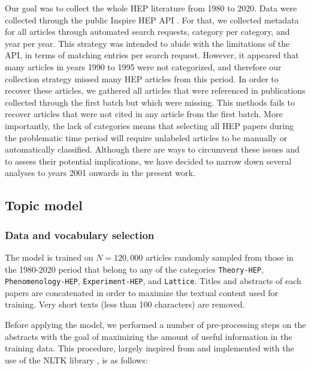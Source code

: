 \documentclass[smallextended]{svjour3}
\begin{document}
Our goal was to collect the whole HEP literature from 1980 to 2020. Data were collected through the public Inspire HEP API \citep{InspireAPI}. For that, we collected metadata for all articles through automated search requests, category per category, and year per year. This strategy was intended to abide with the limitations of the API, in terms of matching entries per search request. However, it appeared that many articles in years 1990 to 1995 were not categorized, and therefore our collection strategy missed many HEP articles from this period. In order to recover these articles, we gathered all articles that were referenced in publications collected through the first batch but which were missing. This methods fails to recover articles that were not cited in any article from the first batch. More importantly, 
the lack of categories means that selecting all HEP papers during the problematic time period will require unlabeled articles to be manually or automatically classified. Although there are ways to circumvent these issues and to assess their potential implications, we have decided to narrow down several analyses to years 2001 onwards in the present work.


\subsection{Topic model}


\subsubsection{\label{appendix:data_selection}Data and vocabulary selection}

The model is trained on $N=120,000$ articles randomly sampled from those in the 1980-2020 period that belong to any of the categories \texttt{Theory-HEP}, \texttt{Phenomenology-HEP}, \texttt{Experiment-HEP}, and \texttt{Lattice}. Titles and abstracts of each papers are concatenated in order to maximize the textual content used for training. Very short texts (less than 100 characters) are removed.

Before applying the model, we performed a number of pre-processing steps on the abstracts with the goal of maximizing the amount of useful information in the training data. This procedure, largely inspired from \citealt{omodei_tel-01097702} and implemented with the use of the NLTK library \citep{nltk}, is as follows:
\end{document}
